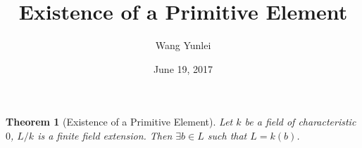 \documentclass{amsart}
\theoremstyle{plain}
\newtheorem{theorem}{Theorem}
\theoremstyle{definition}
\theoremstyle{remark}
\numberwithin{equation}{section}
\begin{document}
	\title[Complete-simple distributive lattices]
	{Existence of a Primitive Element}
	\author{Wang Yunlei}
	\date{June 19, 2017}
	
	\maketitle
	\begin{theorem}[Existence of a Primitive Element]\label{17-1}
		Let $ k $ be a field of characteristic $ 0 $, $ L/k $ is a finite field extension. Then $ \exists b\in L $ such that $ L=k(b) $.
	\end{theorem}
	
\end{document}
